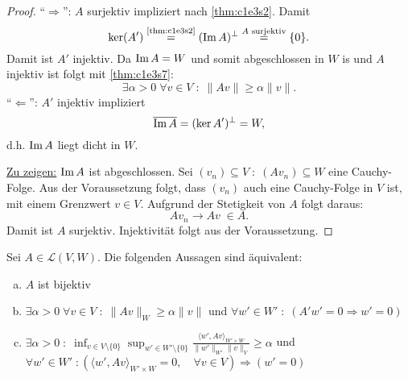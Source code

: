 \documentclass[../skript.tex]{subfiles}
\begin{document}
\begin{proof}
``$\Rightarrow$'': $A$ surjektiv impliziert nach \cref{thm:c1e3s2}. Damit
\[
	\ker(A') \overset{\text{\cref{thm:c1e3s2}}}{=} (\im A)^\perp \overset{A \text{ surjektiv}}{=} \{ 0 \}.
\]
Damit ist $A'$ injektiv.
Da $\operatorname{Im} A = W$ und somit abgeschlossen in $W$ is und $A$ injektiv ist folgt mit \cref{thm:c1e3s7}:
\[
	\exists \alpha > 0 \; \forall v \in V \; : \; \| A v \| \geq \alpha \| v \|.
\]
``$\Leftarrow$'': $A'$ injektiv impliziert
\[
	\overline{\operatorname{Im} A} = (\ker A')^\perp = W,
\]
d.h. $\operatorname{Im} A$ liegt dicht in $W$.

\underline{Zu zeigen:} $\operatorname{Im} A$ ist abgeschlossen.
Sei $(v_n) \subseteq V \; : \; (A v_n) \subseteq W$ eine Cauchy-Folge.
Aus der Voraussetzung folgt, dass $(v_n)$ auch eine Cauchy-Folge in $V$ ist, mit einem Grenzwert $v \in V$. Aufgrund der Stetigkeit von $A$ folgt daraus:
\[
	Av_n \to Av \; \in  A.
\]
Damit ist $A$ surjektiv. Injektivität folgt aus der Voraussetzung.
\end{proof}
\begin{corollary} %
\label{thm:c1e3s9}
Sei $A \in \mathcal{L}(V, W)$. Die folgenden Aussagen sind äquivalent:
\begin{enumerate}[(a)]
\item $A$ ist bijektiv
\item $\exists \alpha > 0 \; \forall v \in V \; : \; \| A v \|_W \geq \alpha \| v \|$ und $\forall w' \in W' \; : \; (A' w' = 0 \Rightarrow w' = 0)$
\item $\exists \alpha > 0 \; : \; \inf_{v \in V \setminus \{ 0\}} \sup_{w' \in W' \setminus \{ 0\}} \frac{\langle w', Av \rangle_{W' \times W}}{\| w' \|_{W'} \| v \|_V} \geq \alpha$ und \\ $\forall w' \in W' \; : \left(\langle w', Av\rangle_{W'\times W} =0, \quad \forall v\in V \right) \Rightarrow (w'=0)$
\end{enumerate}
\end{corollary}
\end{document}
